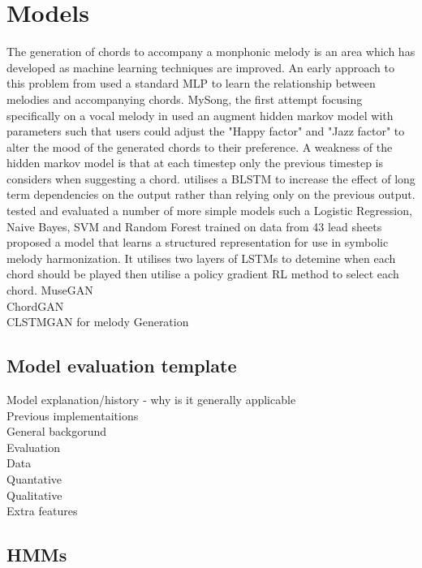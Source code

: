 \section{Models}

The generation of chords to accompany a monphonic melody is an area which has developed as machine learning techniques are improved. 
An early approach to this problem from \cite{ChordPrediction} used a standard MLP to learn the relationship between melodies and accompanying chords.
MySong, the first attempt focusing specifically on a vocal melody in \cite{MySong} used an augment hidden markov model with parameters such that users could adjust the "Happy factor" and "Jazz factor" to alter the mood of the generated chords to their preference.
A weakness of the hidden markov model is that at each timestep only the previous timestep is considers when suggesting a chord. 
\cite{BLSTM} utilises a BLSTM to increase the effect of long term dependencies on the output rather than relying only on the previous output.
\cite{MLForChords} tested and evaluated a number of more simple models such a Logistic Regression, Naive Bayes, SVM and Random Forest trained on data from 43 lead sheets \\
\cite{ReinforcementLearning} proposed a model  that learns a structured representation for use in symbolic melody harmonization. It utilises two layers of LSTMs to detemine when each chord should be played then utilise a policy gradient RL method to select each chord.
MuseGAN \\      
ChordGAN \\       
CLSTMGAN for melody Generation \\

\subsection{Model evaluation template}
Model explanation/history - why is it generally applicable \\
Previous implementaitions \\
    General backgorund \\
    Evaluation \\
        Data \\
        Quantative \\
        Qualitative \\
        Extra features \\
\subsection{HMMs}
\label{subsec:HMM}
